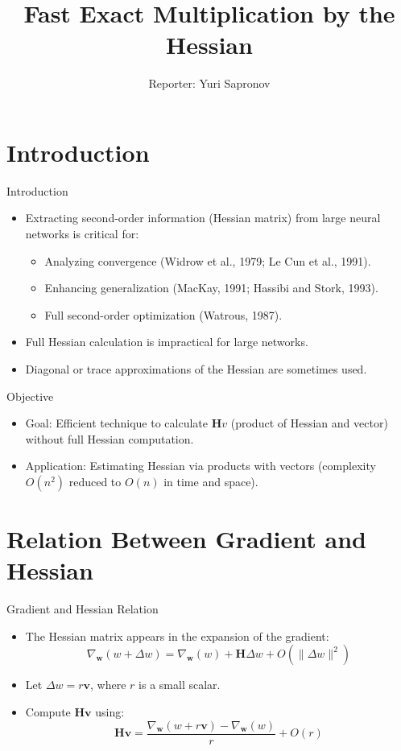 \documentclass{beamer}
\title{Fast Exact Multiplication by the Hessian}
\author{Reporter: Yuri Sapronov}
\date{}
\begin{document}
\frame{\titlepage}

\section{Introduction}
\begin{frame}{Introduction}
    \begin{itemize}
        \item Extracting second-order information (Hessian matrix) from large neural networks is critical for:
        \begin{itemize}
            \item Analyzing convergence (Widrow et al., 1979; Le Cun et al., 1991).
            \item Enhancing generalization (MacKay, 1991; Hassibi and Stork, 1993).
            \item Full second-order optimization (Watrous, 1987).
        \end{itemize}
        \item Full Hessian calculation is impractical for large networks.
        \item Diagonal or trace approximations of the Hessian are sometimes used.
    \end{itemize}
\end{frame}

\begin{frame}{Objective}
    \begin{itemize}
        \item Goal: Efficient technique to calculate \( \mathbf{H}v \) (product of Hessian and vector) without full Hessian computation.
        \item Application: Estimating Hessian via products with vectors (complexity \( O(n^2) \) reduced to \( O(n) \) in time and space).
    \end{itemize}
\end{frame}

\section{Relation Between Gradient and Hessian}
\begin{frame}{Gradient and Hessian Relation}
    \begin{itemize}
        \item The Hessian matrix appears in the expansion of the gradient:
        \[
        \nabla_{\mathbf{w}}(w + \Delta w) = \nabla_{\mathbf{w}}(w) + \mathbf{H}\Delta w + O(\|\Delta w\|^2)
        \]
        \item Let \( \Delta w = r\mathbf{v} \), where \( r \) is a small scalar.
        \item Compute \( \mathbf{H}\mathbf{v} \) using:
        \[
        \mathbf{H}\mathbf{v} = \frac{\nabla_{\mathbf{w}}(w + r\mathbf{v}) - \nabla_{\mathbf{w}}(w)}{r} + O(r)
        \]
    \end{itemize}
\end{frame}
\end{document}
